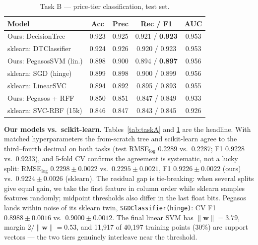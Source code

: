 \documentclass[10pt,twocolumn,a4paper]{article}
\begin{document}
\begin{table}[t]
  \centering
  \caption{Task B --- price-tier classification, test set.}
  \label{tab:taskB}
  \small
  \begin{tabular}{@{}lcccc@{}}
    \toprule
    Model & Acc & Prec & Rec / F1 & AUC \\
    \midrule
    Ours: DecisionTree        & 0.923 & 0.925 & 0.921 / \textbf{0.923} & 0.953 \\
    sklearn: DTClassifier     & 0.924 & 0.926 & 0.920 / 0.923 & 0.953 \\
    Ours: PegasosSVM (lin.)   & 0.898 & 0.900 & 0.894 / \textbf{0.897} & 0.956 \\
    sklearn: SGD (hinge)      & 0.899 & 0.898 & 0.900 / 0.899 & 0.956 \\
    sklearn: LinearSVC        & 0.894 & 0.892 & 0.895 / 0.893 & 0.955 \\
    Ours: Pegasos + RFF       & 0.850 & 0.851 & 0.847 / 0.849 & 0.933 \\
    sklearn: SVC-RBF (15k)    & 0.846 & 0.847 & 0.843 / 0.845 & 0.926 \\
    \bottomrule
  \end{tabular}
\end{table}

\textbf{Our models vs.\ scikit-learn.} Tables~\ref{tab:taskA} and
\ref{tab:taskB} are the headline. With matched hyperparameters the
from-scratch tree and scikit-learn agree to the third--fourth decimal on
both tasks (test RMSE$_{\log}$ 0.2289 vs.\ 0.2287; F1 0.9228 vs.\ 0.9233),
and 5-fold CV confirms the agreement is systematic, not a lucky split:
RMSE$_{\log}$ $0.2298\pm0.0022$ vs.\ $0.2295\pm0.0021$, F1
$0.9226\pm0.0022$ (ours) vs.\ $0.9224\pm0.0026$ (sklearn). The residual
gap is tie-breaking: when several splits give equal gain, we take the
first feature in column order while sklearn samples features randomly;
midpoint thresholds also differ in the last float bits. Pegasos lands
within noise of its sklearn twin, \texttt{SGDClassifier(hinge)}: CV F1
$0.8988\pm0.0016$ vs.\ $0.9000\pm0.0012$. The final linear SVM has
$\lVert\mathbf{w}\rVert = 3.79$, margin $2/\lVert\mathbf{w}\rVert =
0.53$, and 11{,}917 of 40{,}197 training points ($30\%$) are support
vectors --- the two tiers genuinely interleave near the threshold.
\end{document}
